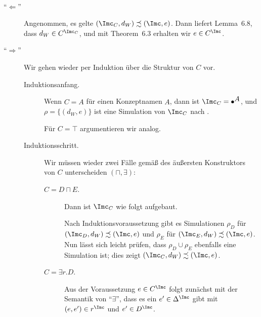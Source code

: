\documentclass[fontsize=11pt, twoside=false, numbers=autoenddot]{scrbook}
\begin{document}
\goodbreak
\parII
{}~
%
\begin{description}
  \item[{\boldmath "`$\Leftarrow$"'}] 
    Angenommen, es gelte $(\Imc_C,d_W) \precsim (\Imc,e)$.
    Dann liefert Lemma~6.8, dass $d_W \in C^{\Imc_C}$,
    und mit Theorem~6.3 erhalten wir $e \in C^\Imc$.
  \item[{\boldmath "`$\Rightarrow$"'}] 
    Wir gehen wieder per Induktion über die Struktur von $C$ vor.
    \begin{description}
      \item[Induktionsanfang.]
        Wenn $C=A$ für einen Konzeptnamen $A$,
        dann ist $\Imc_C = \bullet^{\text{{\normalsize $A$}}}$,
        und $\rho = \{(d_W,e)\}$ ist eine Simulation von $\Imc_C$ nach \Imc.
        
        Für $C=\top$ argumentieren wir analog.
      \item[Induktionsschritt.]
        Wir müssen wieder zwei Fälle gemäß des äußersten Konstruktors
        von $C$ unterscheiden $(\sqcap,\exists)$:
        \goodbreak
        \begin{description}
          \item[{\boldmath $C=D \sqcap E$.}]
            Dann ist $\Imc_C$ wie folgt aufgebaut.
            \begin{center}
            \end{center}
            \parI
            Nach Induktionsvoraussetzung 
            gibt es Simulationen $\rho_D$ für $(\Imc_D,d_W) \precsim (\Imc,e)$
            und $\rho_E$ für $(\Imc_E,d_W) \precsim (\Imc,e)$.
            Nun lässt sich leicht prüfen, dass $\rho_D \cup \rho_E$
            ebenfalls eine Simulation ist;
            dies zeigt $(\Imc_C,d_W) \precsim (\Imc,e)$.
            \parI
          \item[{\boldmath $C=\exists r.D$.}]
            Aus der Voraussetzung $e \in C^\Imc$
            folgt zunächst mit der Semantik von "`$\exists$"',
            dass es ein $e' \in \Delta^\Imc$ gibt mit
            $(e,e') \in r^\Imc$ und $e' \in D^\Imc$.
            

\end{description}
\end{description}
\end{description}
\end{document}
